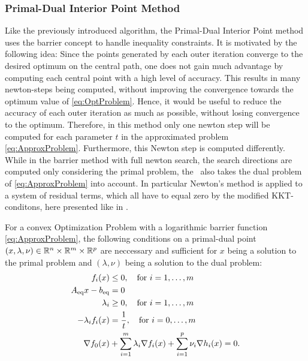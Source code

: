 \subsubsection{Primal-Dual Interior Point Method}
Like the previously introduced algorithm, the Primal-Dual Interior Point method uses the barrier concept to handle inequality constraints. It is motivated by the following idea: Since the points generated by each outer iteration converge to the desired optimum on the central path, one does not gain much advantage by computing each central point with a high level of accuracy. This results in many newton-steps being computed, without improving the convergence towards the optimum value of \eqref{eq:OptProblem}. Hence, it would be useful to reduce the accuracy of each outer iteration as much as possible, without losing convergence to the optimum. Therefore, in this method only one newton step will be computed for each parameter $ t $ in the approximated problem  \eqref{eq:ApproxProblem}. Furthermore, this Newton step is computed differently. While in the barrier method with full newton search,  the search directions are computed only considering the primal problem, the \pdm \ also takes the dual problem of \eqref{eq:ApproxProblem} into account. In particular Newton's method is applied to a system of residual terms, which all have to equal zero by the modified KKT-conditons, here presented like in \cite{BV}.\\
\begin{theorem}
	For a convex Optimization Problem with a logarithmic barrier function \eqref{eq:ApproxProblem}, the following conditions on a primal-dual point $ (x,\lambda,\nu) \in \mathbb{R}^n \times \mathbb{R}^m \times \mathbb{R}^p$ are neccessary and sufficient for $ x $ being a solution to the primal problem and $ (\lambda, \nu) $ being a solution to the dual problem:
	\begin{subequations}
			\begin{align}
		f_i(x) &\leq 0, \quad \text{for } i = 1,\dots,m\\
		{A}_{\mathrm{eq}} x - {b}_{\mathrm{eq}} &= 0\\
		\lambda_i &\geq 0,  \quad \text{for } i = 1,\dots,m\\
		-\lambda_i f_i(x) & = \frac{1}{t}, \quad \text{for } i = 0, \dots,m\\
		\nabla f_0(x) &+ \sum_{i=1}^{m} \lambda_i \nabla f_i(x) + \sum_{i=1}^{p} \nu_i \nabla h_i (x) = 0.
		\end{align}
	\end{subequations}
\end{theorem}

